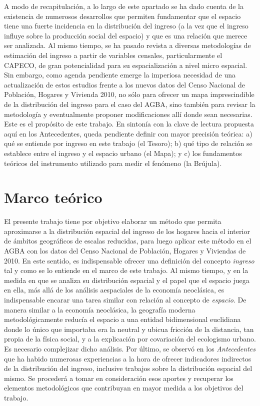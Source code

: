 A modo de recapitulación, a lo largo de este apartado se ha dado cuenta de la existencia de numerosos desarrollos que permiten fundamentar que el espacio tiene una fuerte incidencia en la distribución del ingreso (a la vez que el ingreso influye sobre la producción social del espacio) y que es una relación que merece ser analizada. Al mismo tiempo, se ha pasado revista a diversas metodologías de estimación del ingreso a partir de variables censales, particularmente el CAPECO, de gran potencialidad para su espacialización a nivel micro espacial. Sin embargo, como agenda pendiente emerge la imperiosa necesidad de una actualización de estos estudios frente a los nuevos datos del Censo Nacional de Población, Hogares y Vivienda 2010, no sólo para ofrecer un mapa imprescindible de la distribución del ingreso para el caso del AGBA, sino también para revisar la metodología y eventualmente proponer modificaciones allí donde sean necesarias. Este es el propósito de este trabajo. En sintonía con la clave de lectura propuesta aquí en los Antecedentes, queda pendiente definir con mayor precisión teórica: a) qué se entiende por ingreso en este trabajo (el Tesoro); b) qué tipo de relación se establece entre el ingreso y el espacio urbano (el Mapa); y c) los fundamentos teóricos del instrumento utilizado para medir el fenómeno (la Brújula). 

\section{Marco teórico}
	
El presente trabajo tiene por objetivo elaborar un método que permita aproximarse a la distribución espacial del ingreso de los hogares hacia el interior de ámbitos geográficos de escalas reducidas, para luego aplicar este método en el AGBA con los datos del Censo Nacional de Población, Hogares y Viviendas de 2010. En este sentido, es indispensable ofrecer una definición del concepto \textit{ingreso } tal y como se lo entiende en el marco de este trabajo. Al mismo tiempo, y en la medida en que se analiza su distribución espacial y el papel que el espacio juega en ella, más allá de los análisis aespaciales de la economía neoclásica, es indispensable encarar una tarea similar con relación al concepto de \textit{espacio}. De manera similar a la economía neoclásica, la geografía moderna metodológicamente reducía el espacio a una entidad bidimensional euclidiana donde lo único que importaba era la neutral y ubicua fricción de la distancia, tan propia de la física social, y a la explicación por covariación del ecologismo urbano. Es necesario complejizar dicho análisis. Por último, se observó en los \textit{Antecedentes} que ha habido numerosas experiencias a la hora de ofrecer indicadores indirectos de la distribución del ingreso, inclusive trabajos sobre la distribución espacial del mismo. Se procederá a tomar en consideración esos aportes y recuperar los elementos metodológicos que contribuyan en mayor medida a los objetivos del trabajo.
	
